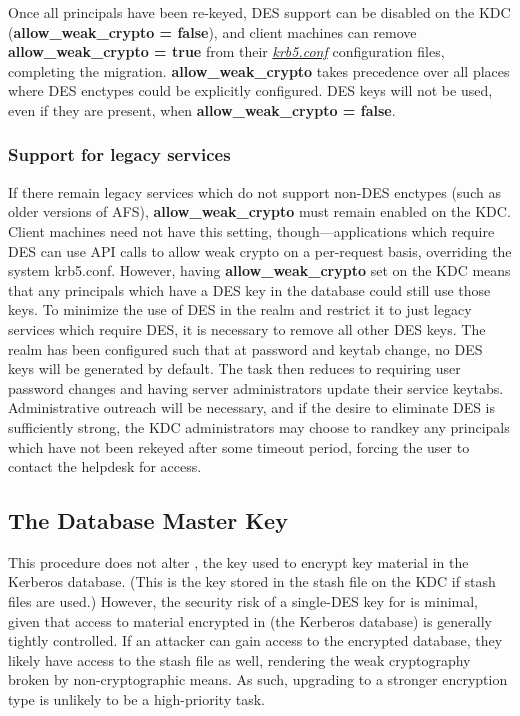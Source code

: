 \documentclass[letterpaper,10pt,english]{sphinxmanual}
\begin{document}
Once all principals have been re-keyed, DES support can be disabled on the
KDC (\textbf{allow\_weak\_crypto = false}), and client machines can remove
\textbf{allow\_weak\_crypto = true} from their {\hyperref[admin/conf_files/krb5_conf:krb5-conf-5]{\emph{krb5.conf}}} configuration
files, completing the migration.  \textbf{allow\_weak\_crypto} takes precedence over
all places where DES enctypes could be explicitly configured.  DES keys will
not be used, even if they are present, when \textbf{allow\_weak\_crypto = false}.


\subsubsection{Support for legacy services}
\label{admin/advanced/retiring-des:support-for-legacy-services}
If there remain legacy services which do not support non-DES enctypes
(such as older versions of AFS), \textbf{allow\_weak\_crypto} must remain
enabled on the KDC.  Client machines need not have this setting,
though---applications which require DES can use API calls to allow
weak crypto on a per-request basis, overriding the system krb5.conf.
However, having \textbf{allow\_weak\_crypto} set on the KDC means that any
principals which have a DES key in the database could still use those
keys.  To minimize the use of DES in the realm and restrict it to just
legacy services which require DES, it is necessary to remove all other
DES keys.  The realm has been configured such that at password and
keytab change, no DES keys will be generated by default.  The task
then reduces to requiring user password changes and having server
administrators update their service keytabs.  Administrative outreach
will be necessary, and if the desire to eliminate DES is sufficiently
strong, the KDC administrators may choose to randkey any principals
which have not been rekeyed after some timeout period, forcing the
user to contact the helpdesk for access.


\subsection{The Database Master Key}
\label{admin/advanced/retiring-des:the-database-master-key}
This procedure does not alter , the key used to encrypt key
material in the Kerberos database.  (This is the key stored in the stash file
on the KDC if stash files are used.)  However, the security risk of
a single-DES key for  is minimal, given that access to material
encrypted in  (the Kerberos database) is generally tightly controlled.
If an attacker can gain access to the encrypted database, they likely
have access to the stash file as well, rendering the weak cryptography
broken by non-cryptographic means.  As such, upgrading  to a stronger
encryption type is unlikely to be a high-priority task.
\end{document}
